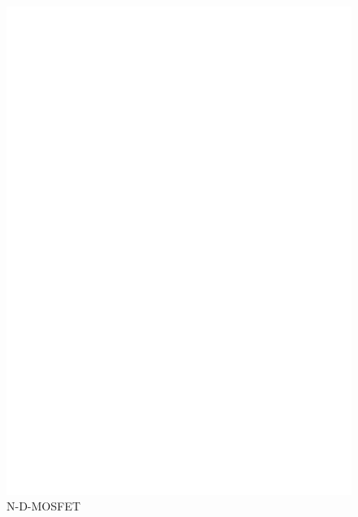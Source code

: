 \begin{figure}[H]
\centering
\includegraphics[]{../FIG/MOS_BSS169.eps}
\caption{N-D-MOSFET}
\label{fig:MOS-N-D}
\end{figure}

